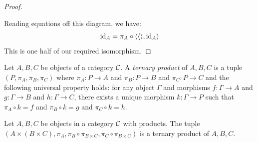 \begin{proof}
  \begin{center}
  \end{center}

  Reading equations off this diagram, we have:
  \begin{align}
    \operatorname{id}_A = \pi_A \circ \langle \langle \rangle, \operatorname{id}_A \rangle
  \end{align}
  This is one half of our required isomorphism.

\end{proof}

\begin{definition}
  Let \(A,B,C\) be objects of a category \(\mathcal C\).
  A \emph{ternary product} of \(A,B,C\)
  is a tuple \((P,\pi_A,\pi_B,\pi_C)\)
  where \(\pi_A : P\to A\) and \(\pi_B : P \to B\)
  and \(\pi_C : P \to C\)
  and the following universal property holds:
  for any object \(\Gamma\)
  and morphisms \(f : \Gamma \to A\)
  and \(g : \Gamma \to B\) and \(h : \Gamma \to C\),
  there exists a unique morphism \(k : \Gamma \to P\)
  such that \(\pi_A \circ k = f\)
  and \(\pi_B \circ k = g\) and \(\pi_C \circ k = h\).
\end{definition}

\begin{proposition}
  Let \(A,B,C\) be objects in a category \(\mathcal C\) with products.
  The tuple \((A\times (B\times C), \pi_A, \pi_B \circ \pi_{B\times C}, \pi_C \circ \pi_{B\times C})\)
  is a ternary product of \(A,B,C\).
\end{proposition}

